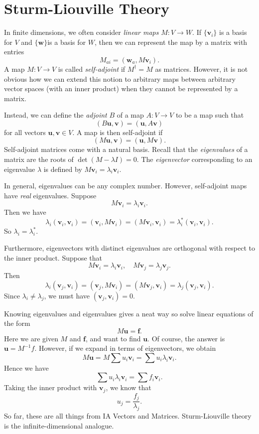 \documentclass[a4paper]{article}
\begin{document}
\section{Sturm-Liouville Theory}
In finite dimensions, we often consider \emph{linear maps} $M: V\to W$. If $\{\mathbf{v}_i\}$ is a basis for $V$ and $\{\mathbf{w}\}$is a basis for $W$, then we can represent the map by a matrix with entries
\[
  M_{ai} = (\mathbf{w}_a, M\mathbf{v}_i).
\]
A map $M: V\to V$ is called \emph{self-adjoint} if $M^\dagger = M$ as matrices. However, it is not obvious how we can extend this notion to arbitrary maps between arbitrary vector spaces (with an inner product) when they cannot be represented by a matrix.

Instead, we can define the \emph{adjoint} $B$ of a map $A: V\to V$ to be a map such that
\[
  (B\mathbf{u}, \mathbf{v}) = (\mathbf{u}, A\mathbf{v})
\]
for all vectors $\mathbf{u}, \mathbf{v}\in V$. A map is then self-adjoint if
\[
  (M\mathbf{u}, \mathbf{v}) = (\mathbf{u}, M\mathbf{v}).
\]
Self-adjoint matrices come with a natural basis. Recall that the \emph{eigenvalues} of a matrix are the roots of $\det(M - \lambda I) = 0$. The \emph{eigenvector} corresponding to an eigenvalue $\lambda$ is defined by $M\mathbf{v}_i = \lambda_i \mathbf{v}_i$.

In general, eigenvalues can be any complex number. However, self-adjoint maps have \emph{real} eigenvalues. Suppose
\[
  M\mathbf{v}_i = \lambda_i \mathbf{v}_i.
\]
Then we have
\[
  \lambda_i (\mathbf{v}_i, \mathbf{v}_i) = (\mathbf{v}_i, M\mathbf{v}_i) = (M\mathbf{v}_i, \mathbf{v}_i) = \lambda_i^* (\mathbf{v}_i, \mathbf{v}_i).
\]
So $\lambda_i = \lambda_i^*$.

Furthermore, eigenvectors with distinct eigenvalues are orthogonal with respect to the inner product. Suppose that
\[
  M \mathbf{v}_i = \lambda_i \mathbf{v}_i,\quad M \mathbf{v}_j = \lambda_j \mathbf{v}_j.
\]
Then
\[
  \lambda_i (\mathbf{v}_j, \mathbf{v}_i) = (\mathbf{v}_j, M\mathbf{v}_i) = (M\mathbf{v}_j, \mathbf{v}_i) = \lambda_j(\mathbf{v}_j, \mathbf{v}_i).
\]
Since $\lambda_i \not= \lambda_j$, we must have $(\mathbf{v}_j, \mathbf{v}_i) = 0$.

Knowing eigenvalues and eigenvalues gives a neat way so solve linear equations of the form
\[
  M \mathbf{u} = \mathbf{f}.
\]
Here we are given $M$ and $\mathbf{f}$, and want to find $\mathbf{u}$. Of course, the answer is $\mathbf{u} = M^{-1}f$. However, if we expand in terms of eigenvectors, we obtain
\[
  M\mathbf{u} = M\sum u_i \mathbf{v}_i = \sum u_i \lambda_i \mathbf{v}_i.
\]
Hence we have
\[
  \sum u_i \lambda_i \mathbf{v}_i = \sum f_i \mathbf{v}_i.
\]
Taking the inner product with $\mathbf{v}_j$, we know that
\[
  u_j = \frac{f_j}{\lambda_j}.
\]
So far, these are all things from IA Vectors and Matrices. Sturm-Liouville theory is the infinite-dimensional analogue.
\end{document}
